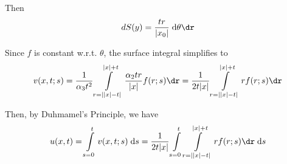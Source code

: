 Then
$$
dS(y) = \frac{t r}{|x_0|} \dd{\theta} \dr
$$

Since $f$ is constant w.r.t. $\theta$, the surface integral simplifies to
$$
v(x, t; s) = \frac{1}{\alpha_3 t^2} \int \limits_{r = ||x| - t|}^{|x| + t} \frac{\alpha_2 t r}{|x|} f(r; s) \dr
           = \frac{1}{2 t |x|} \int \limits_{r = ||x| - t|}^{|x| + t} r f(r; s) \dr
$$

Then, by Duhmamel's Principle, we have
$$
u(x, t) = \int \limits_{s=0}^t v(x, t; s) \ds
  = \frac{1}{2 t |x|} \int \limits_{s=0}^t \int \limits_{r = ||x| - t|}^{|x| + t} r f(r; s) \dr \ds
$$
